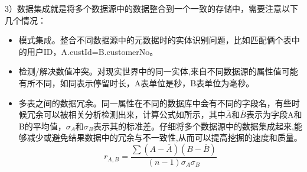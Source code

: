 \begin{itemize}
  \begin{figure}
  \centering
    \label{pic:hl_cluster}
  \end{figure}
  \end{itemize}

  3）数据集成就是将多个数据源中的数据整合到一个一致的存储中，需要注意以下几个情况：
  \begin{itemize}
  \item 模式集成。整合不同数据源中的元数据时的实体识别问题，比如匹配俩个表中的用户ID，A.custId=B.customerNo。
  \item 检测/解决数值冲突。对现实世界中的同一实体,来自不同数据源的属性值可能有所不同，如同表示停留时长，A表单位是秒，B表单位为毫秒。
  \item 多表之间的数据冗余。同一属性在不同的数据库中会有不同的字段名，有些时候冗余可以被相关分析检测出来，计算公式如所示，其中$\overline{A}$和$\overline{B}$表示为字段A和B的平均值，$\sigma_A和\sigma_B$表示其的标准差。仔细将多个数据源中的数据集成起来,能够减少或避免结果数据中的冗余与不一致性,从而可以提高挖掘的速度和质量。
  \begin{equation}
    r_{A,B} = \frac{\sum (A-\overline{A})(B-\overline{B})}{(n-1)\sigma_A\sigma_B}
    \label{F-Measure}
  \end{equation}
  \end{itemize}

